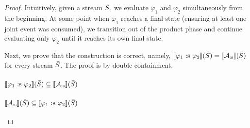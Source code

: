 \begin{proof}
	Intuitively, given a stream $\bar{S}$, we evaluate $\varphi_1$ and $\varphi_2$ simultaneously from the beginning. At some point when $\varphi_1$ reaches a final state (ensuring at least one joint event was consumed), we transition out of the product phase and continue evaluating only $\varphi_2$ until it reaches its own final state.
	
	Next, we prove that the construction is correct, namely, $\sem{\varphi_1 \starts \varphi_2}(\Stream) = \sem{\cAstarts}(\Stream)$ for every stream $\bar{S}$. The proof is by double containment.
	
	\paragraph{$\sem{\varphi_1 \starts \varphi_2}(\Stream) \subseteq \sem{\cAstarts}(\Stream)$}
	
	\paragraph{$\sem{\cAstarts}(\Stream) \subseteq \sem{\varphi_1 \starts \varphi_2}(\Stream)$}
\end{proof}